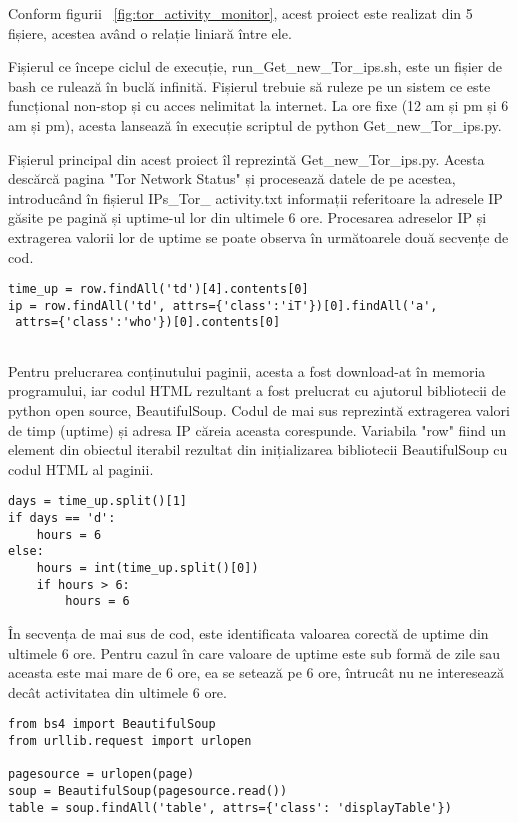 Conform figurii ~\ref{fig:tor_activity_monitor},  acest proiect este realizat din 5 fișiere, acestea având o relație liniară între ele.

Fișierul ce începe ciclul de execuție,  run\_Get\_new\_Tor\_ips.sh, este un fișier de bash ce rulează în buclă infinită. Fișierul trebuie să ruleze pe un sistem ce este funcțional non-stop și cu acces nelimitat la internet. La ore fixe (12 am și pm și 6 am și pm), acesta lansează în execuție scriptul de python  Get\_new\_Tor\_ips.py.

Fișierul principal din acest proiect îl reprezintă  Get\_new\_Tor\_ips.py.  Acesta descărcă pagina "Tor Network Status" \cite{tot_status}  și procesează datele de pe acestea, introducând în fișierul IPs\_Tor\_ activity.txt  informații referitoare la adresele IP găsite pe pagină și uptime-ul lor din ultimele 6 ore. Procesarea adreselor IP și extragerea valorii lor de uptime se poate observa în următoarele două secvențe de cod. 

\lstset{language=python,frame=single, showstringspaces=false}
\begin{lstlisting}
time_up = row.findAll('td')[4].contents[0]
ip = row.findAll('td', attrs={'class':'iT'})[0].findAll('a',
 attrs={'class':'who'})[0].contents[0]


\end{lstlisting}

Pentru prelucrarea conținutului paginii, acesta a fost download-at în memoria programului, iar codul HTML rezultant a fost prelucrat cu ajutorul bibliotecii de python open source, BeautifulSoup. Codul de mai sus reprezintă extragerea valori de timp (uptime) și adresa IP căreia aceasta corespunde. Variabila "row" fiind un element din obiectul iterabil rezultat din inițializarea bibliotecii BeautifulSoup cu codul HTML al paginii. 

\lstset{language=python,frame=single, showstringspaces=false}
\begin{lstlisting}
days = time_up.split()[1]
if days == 'd':
    hours = 6
else:
    hours = int(time_up.split()[0])
    if hours > 6:
        hours = 6

\end{lstlisting}

În secvența de mai sus de cod, este identificata valoarea corectă de uptime din ultimele 6 ore. Pentru cazul în care valoare de uptime este sub formă de zile sau aceasta este mai mare de 6 ore, ea se setează pe 6 ore, întrucât nu ne interesează decât activitatea din ultimele 6 ore. 
\begin{lstlisting}
from bs4 import BeautifulSoup
from urllib.request import urlopen

pagesource = urlopen(page)
soup = BeautifulSoup(pagesource.read())
table = soup.findAll('table', attrs={'class': 'displayTable'})
\end{lstlisting}


